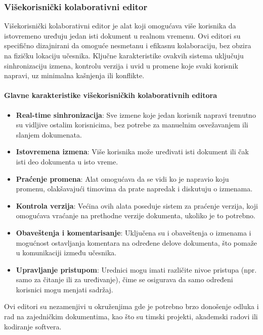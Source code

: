 \documentclass[12pt]{article}
\begin{document}
\subsubsection{Višekorisnički kolaborativni editor}

Višekorisnički kolaborativni editor je alat koji omogućava više korisnika da istovremeno uređuju jedan isti dokument u realnom vremenu. Ovi editori su specifično dizajnirani da omoguće nesmetanu i efikasnu kolaboraciju, bez obzira na fizičku lokaciju učesnika. Ključne karakteristike ovakvih sistema uključuju sinhronizaciju izmena, kontrolu verzija i uvid u promene koje svaki korisnik napravi, uz minimalna kašnjenja ili konflikte.

\paragraph {Glavne karakteristike višekorisničkih kolaborativnih editora}
    
\begin{itemize}
	\item \textbf{Real-time sinhronizacija}: Sve izmene koje jedan korisnik napravi trenutno su vidljive ostalim korisnicima, bez potrebe za manuelnim osvežavanjem ili slanjem dokumenata.
	\item \textbf{Istovremena izmena}: Više korisnika može uređivati isti dokument ili čak isti deo dokumenta u isto vreme.
	\item \textbf{Praćenje promena}: Alat omogućava da se vidi ko je napravio koju promenu, olakšavajući timovima da prate napredak i diskutuju o izmenama.
	\item \textbf{Kontrola verzija}: Većina ovih alata poseduje sistem za praćenje verzija, koji omogućava vraćanje na prethodne verzije dokumenta, ukoliko je to potrebno.
	\item \textbf{Obaveštenja i komentarisanje}: Uključena su i obaveštenja o izmenama i mogućnost ostavljanja komentara na određene delove dokumenta, što pomaže u komunikaciji između učesnika.
	\item \textbf{Upravljanje pristupom}: Urednici mogu imati različite nivoe pristupa (npr. samo za čitanje ili za uređivanje), čime se osigurava da samo određeni korisnici mogu menjati sadržaj.
\end{itemize}

Ovi editori su nezamenjivi u okruženjima gde je potrebno brzo donošenje odluka i rad na zajedničkim dokumentima, kao što su timski projekti, akademski radovi ili kodiranje softvera.
\end{document}
